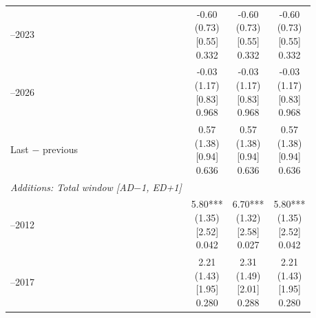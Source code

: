 \begin{threeparttable}
\begin{tabular}{@{}lccc}
\addlinespace[0.25ex]
\addlinespace[0.25ex]
2021–2023 & \makecell{-0.60\\(0.73)\\{}[0.55]\\{0.332}} & \makecell{-0.60\\(0.73)\\{}[0.55]\\{0.332}} & \makecell{-0.60\\(0.73)\\{}[0.55]\\{0.332}} \\
\addlinespace[0.25ex]
\addlinespace[0.25ex]
2024–2026 & \makecell{-0.03\\(1.17)\\{}[0.83]\\{0.968}} & \makecell{-0.03\\(1.17)\\{}[0.83]\\{0.968}} & \makecell{-0.03\\(1.17)\\{}[0.83]\\{0.968}} \\
\addlinespace[0.25ex]
\addlinespace[0.25ex]
Last $-$ previous & \makecell{0.57\\(1.38)\\{}[0.94]\\{0.636}} & \makecell{0.57\\(1.38)\\{}[0.94]\\{0.636}} & \makecell{0.57\\(1.38)\\{}[0.94]\\{0.636}} \\
\addlinespace[0.25ex]
\midrule
\emph{Additions: Total window [AD$-$1, ED+1]} \\
\addlinespace[0.25ex]
\addlinespace[1ex]
2007–2012 & \makecell{5.80***\\(1.35)\\{}[2.52]\\{0.042}} & \makecell{6.70***\\(1.32)\\{}[2.58]\\{0.027}} & \makecell{5.80***\\(1.35)\\{}[2.52]\\{0.042}} \\
\addlinespace[0.25ex]
\addlinespace[0.25ex]
2013–2017 & \makecell{2.21\\(1.43)\\{}[1.95]\\{0.280}} & \makecell{2.31\\(1.49)\\{}[2.01]\\{0.288}} & \makecell{2.21\\(1.43)\\{}[1.95]\\{0.280}} \\

\end{tabular}
\end{threeparttable}
